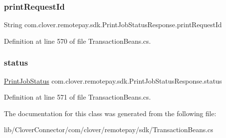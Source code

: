 \subsubsection{\texorpdfstring{print\+Request\+Id}{printRequestId}}
{\footnotesize\ttfamily String com.\+clover.\+remotepay.\+sdk.\+Print\+Job\+Status\+Response.\+print\+Request\+Id}



Definition at line 570 of file Transaction\+Beans.\+cs.

\mbox{\label{classcom_1_1clover_1_1remotepay_1_1sdk_1_1_print_job_status_response_adfd80c8ec89a8344133ed3fdab40f0e8}} 
\subsubsection{\texorpdfstring{status}{status}}
{\footnotesize\ttfamily \hyperlink{namespacecom_1_1clover_1_1remotepay_1_1sdk_a7f035b9087c646b0eebf6280d429f7af}{Print\+Job\+Status} com.\+clover.\+remotepay.\+sdk.\+Print\+Job\+Status\+Response.\+status}



Definition at line 571 of file Transaction\+Beans.\+cs.



The documentation for this class was generated from the following file\+:\begin{DoxyCompactItemize}
\item 
lib/\+Clover\+Connector/com/clover/remotepay/sdk/Transaction\+Beans.\+cs\end{DoxyCompactItemize}

